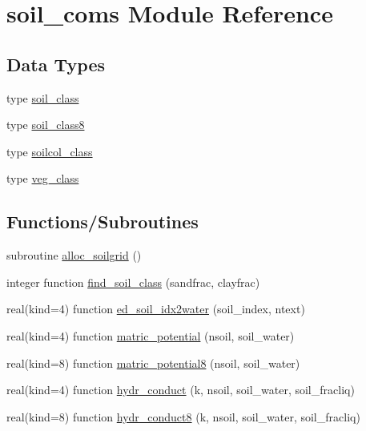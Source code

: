 \hypertarget{namespacesoil__coms}{}\section{soil\+\_\+coms Module Reference}
\label{namespacesoil__coms}
\subsection*{Data Types}
\begin{DoxyCompactItemize}
\item 
type \hyperlink{structsoil__coms_1_1soil__class}{soil\+\_\+class}
\item 
type \hyperlink{structsoil__coms_1_1soil__class8}{soil\+\_\+class8}
\item 
type \hyperlink{structsoil__coms_1_1soilcol__class}{soilcol\+\_\+class}
\item 
type \hyperlink{structsoil__coms_1_1veg__class}{veg\+\_\+class}
\end{DoxyCompactItemize}
\subsection*{Functions/\+Subroutines}
\begin{DoxyCompactItemize}
\item 
subroutine \hyperlink{namespacesoil__coms_ad616d97c9e0bec81cd93be86cd178216}{alloc\+\_\+soilgrid} ()
\item 
integer function \hyperlink{namespacesoil__coms_af8e155e8412b0de0b7b1aa35463611e6}{find\+\_\+soil\+\_\+class} (sandfrac, clayfrac)
\item 
real(kind=4) function \hyperlink{namespacesoil__coms_af338b81aceade9a67dff90cf850e5cc6}{ed\+\_\+soil\+\_\+idx2water} (soil\+\_\+index, ntext)
\item 
real(kind=4) function \hyperlink{namespacesoil__coms_ac656cda53ab267fd2e927c65359524fd}{matric\+\_\+potential} (nsoil, soil\+\_\+water)
\item 
real(kind=8) function \hyperlink{namespacesoil__coms_a7c1fb8a910aaa86ed2ec34257db6e5e3}{matric\+\_\+potential8} (nsoil, soil\+\_\+water)
\item 
real(kind=4) function \hyperlink{namespacesoil__coms_a465d9c7443ba25dad5afd0f2fe6d8cae}{hydr\+\_\+conduct} (k, nsoil, soil\+\_\+water, soil\+\_\+fracliq)
\item 
real(kind=8) function \hyperlink{namespacesoil__coms_aa4131e33c26dc4f026bca85034eba1b9}{hydr\+\_\+conduct8} (k, nsoil, soil\+\_\+water, soil\+\_\+fracliq)
\end{DoxyCompactItemize}
